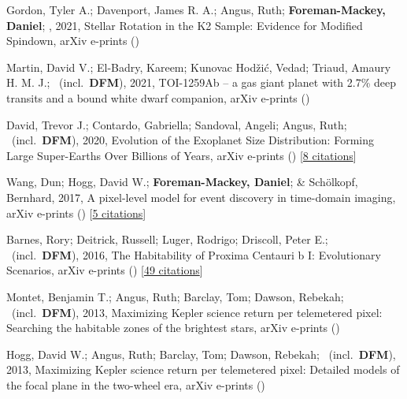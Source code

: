 \item[{\color{numcolor}\scriptsize7}] Gordon, Tyler A.; Davenport, James R. A.; Angus, Ruth; \textbf{Foreman-Mackey, Daniel}; \etal, 2021, Stellar Rotation in the K2 Sample: Evidence for Modified Spindown, arXiv e-prints ()

\item[{\color{numcolor}\scriptsize6}] Martin, David V.; El-Badry, Kareem; Kunovac Hod{\v{z}}i{\'c}, Vedad; Triaud, Amaury H. M. J.; \etal\ (incl.\ \textbf{DFM}), 2021, TOI-1259Ab -- a gas giant planet with 2.7{\%} deep transits and a bound white dwarf companion, arXiv e-prints ()

\item[{\color{numcolor}\scriptsize5}] David, Trevor J.; Contardo, Gabriella; Sandoval, Angeli; Angus, Ruth; \etal\ (incl.\ \textbf{DFM}), 2020, Evolution of the Exoplanet Size Distribution: Forming Large Super-Earths Over Billions of Years, arXiv e-prints () [\href{https://ui.adsabs.harvard.edu/abs/2020arXiv201109894D}{8 citations}]

\item[{\color{numcolor}\scriptsize4}] Wang, Dun; Hogg, David W.; \textbf{Foreman-Mackey, Daniel}; \& Sch{\"o}lkopf, Bernhard, 2017, A pixel-level model for event discovery in time-domain imaging, arXiv e-prints () [\href{https://ui.adsabs.harvard.edu/abs/2017arXiv171002428W}{5 citations}]

\item[{\color{numcolor}\scriptsize3}] Barnes, Rory; Deitrick, Russell; Luger, Rodrigo; Driscoll, Peter E.; \etal\ (incl.\ \textbf{DFM}), 2016, The Habitability of Proxima Centauri b I: Evolutionary Scenarios, arXiv e-prints () [\href{https://ui.adsabs.harvard.edu/abs/2016arXiv160806919B}{49 citations}]

\item[{\color{numcolor}\scriptsize2}] Montet, Benjamin T.; Angus, Ruth; Barclay, Tom; Dawson, Rebekah; \etal\ (incl.\ \textbf{DFM}), 2013, Maximizing Kepler science return per telemetered pixel: Searching the habitable zones of the brightest stars, arXiv e-prints ()

\item[{\color{numcolor}\scriptsize1}] Hogg, David W.; Angus, Ruth; Barclay, Tom; Dawson, Rebekah; \etal\ (incl.\ \textbf{DFM}), 2013, Maximizing Kepler science return per telemetered pixel: Detailed models of the focal plane in the two-wheel era, arXiv e-prints ()
